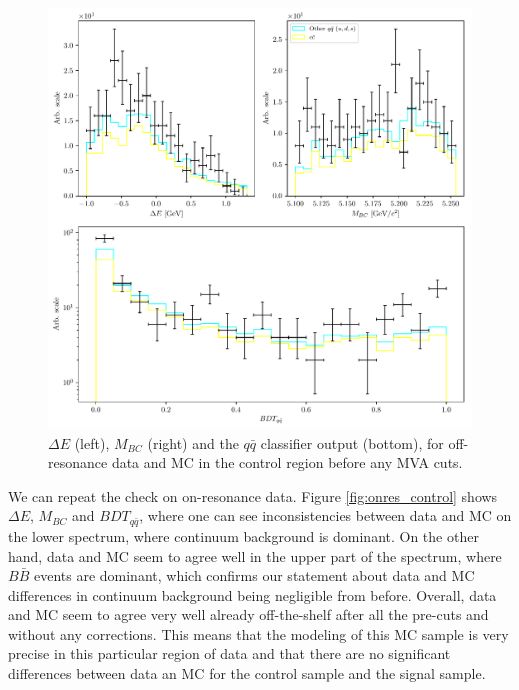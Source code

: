 \documentclass[headings=standardclasses,headings=big,oneside,a4paper,openany,12pt]{scrbook}
\begin{document}
\begin{figure}[H]
\centering
\captionsetup{width=0.8\linewidth}
\includegraphics[width=\linewidth]{fig/offres_control}
\caption{$\Delta E$ (left), $M_{BC}$ (right) and the $q \bar q$ classifier output (bottom), for off-resonance data and MC in the control region before any MVA cuts.}
\label{fig:offres_control}
\end{figure}


We can repeat the check on on-resonance data. Figure \ref{fig:onres_control} shows $\Delta E$, $M_{BC}$ and $BDT_{q \bar q}$, where one can see inconsistencies between data and MC on the lower spectrum, where continuum background is dominant. On the other hand, data and MC seem to agree well in the upper part of the spectrum, where $B \bar B$ events are dominant, which confirms our statement about data and MC differences in continuum background being negligible from before. Overall, data and MC seem to agree very well already off-the-shelf after all the pre-cuts and without any corrections. This means that the modeling of this MC sample is very precise in this particular region of data and that there are no significant differences between data an MC for the control sample and the signal sample.
\end{document}

